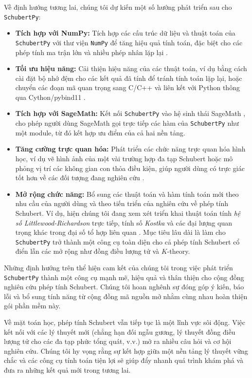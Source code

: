 Về định hướng tương lai, chúng tôi dự kiến một số hướng phát triển sau cho \texttt{SchubertPy}:
\begin{itemize}
    \item \textbf{Tích hợp với NumPy:} Tích hợp các cấu trúc dữ liệu và thuật toán của \texttt{SchubertPy} với thư viện \texttt{NumPy} để tăng hiệu quả tính toán, đặc biệt cho các phép tính ma trận lớn và nhiều phép nhân lặp lại \cite{githubschubertpy}.
    \item \textbf{Tối ưu hiệu năng:} Cải thiện hiệu năng của các thuật toán, ví dụ bằng cách cài đặt bộ nhớ đệm cho các kết quả đã tính để tránh tính toán lặp lại, hoặc chuyển các đoạn mã quan trọng sang C/C++ và liên kết với Python thông qua Cython/pybind11 \cite{githubschubertpy}.
    \item \textbf{Tích hợp với SageMath:} Kết nối \texttt{SchubertPy} vào hệ sinh thái SageMath \cite{sagemath}, cho phép người dùng SageMath gọi trực tiếp các hàm của \texttt{SchubertPy} như một module, từ đó kết hợp ưu điểm của cả hai nền tảng.
    \item \textbf{Tăng cường trực quan hóa:} Phát triển các chức năng trực quan hóa hình học, ví dụ vẽ hình ảnh của một vài trường hợp đa tạp Schubert hoặc mô phỏng vị trí các không gian con thỏa điều kiện, giúp người dùng có trực giác tốt hơn về các đối tượng đang nghiên cứu \cite{githubschubertpy}.
    \item \textbf{Mở rộng chức năng:} Bổ sung các thuật toán và hàm tính toán mới theo nhu cầu của người dùng và theo tiến triển của nghiên cứu về phép tính Schubert. Ví dụ, hiện chúng tôi đang xem xét triển khai thuật toán tính \textit{hệ số Littlewood-Richardson} trực tiếp, tính số \textit{Kostka} và các đại lượng quan trọng khác trong đại số tổ hợp liên quan \cite{githubschubertpy}. Mục tiêu lâu dài là làm cho \texttt{SchubertPy} trở thành một công cụ toàn diện cho cả phép tính Schubert cổ điển lẫn các mở rộng như đồng điều lượng tử và $K$-theory.
\end{itemize}

Những định hướng trên thể hiện cam kết của chúng tôi trong việc phát triển \texttt{SchubertPy} thành một công cụ mạnh mẽ, hiệu quả và thân thiện cho cộng đồng nghiên cứu phép tính Schubert. Chúng tôi hoan nghênh sự đóng góp ý kiến, báo lỗi và bổ sung tính năng từ cộng đồng mã nguồn mở nhằm cùng nhau hoàn thiện gói phần mềm này.

Về mặt toán học, phép tính Schubert vẫn tiếp tục là một lĩnh vực sôi động. Việc kết nối với các lý thuyết mới (chẳng hạn đối ngẫu gương, lý thuyết đồng điều lượng tử cho các đa tạp phức tổng quát, v.v.) mở ra nhiều câu hỏi và cơ hội nghiên cứu. Chúng tôi hy vọng rằng sự kết hợp giữa một nền tảng lý thuyết vững chắc và các công cụ tính toán tiện lợi sẽ giúp đẩy nhanh quá trình khám phá và đưa ra những kết quả mới trong tương lai.